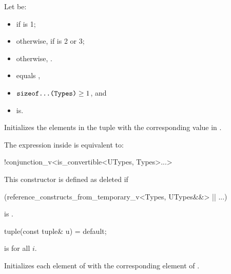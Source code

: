 \begin{itemdescr}
\pnum
Let  be:
\begin{itemize}
\item
{}
if  is 1;
\item
otherwise,
if  is 2 or 3;
\item
otherwise, .
\end{itemize}

\pnum
\constraints
\begin{itemize}
\item
{} equals ,
\item
$\texttt{sizeof...(Types)} \geq 1$, and
\item
{} is\newline {}.
\end{itemize}

\pnum
\effects
Initializes the elements in the tuple with the
corresponding value in .

\pnum
\remarks
The expression inside  is equivalent to:
\begin{codeblock}
!conjunction_v<is_convertible<UTypes, Types>...>
\end{codeblock}
This constructor is defined as deleted if
\begin{codeblock}
(reference_constructs_from_temporary_v<Types, UTypes&&> || ...)
\end{codeblock}
is .
\end{itemdescr}

%
\begin{itemdecl}
tuple(const tuple& u) = default;
\end{itemdecl}

\begin{itemdescr}
\pnum
\mandates
{} is  for all $i$.

\pnum
\effects
Initializes each element of  with the
corresponding element of .
\end{itemdescr}

